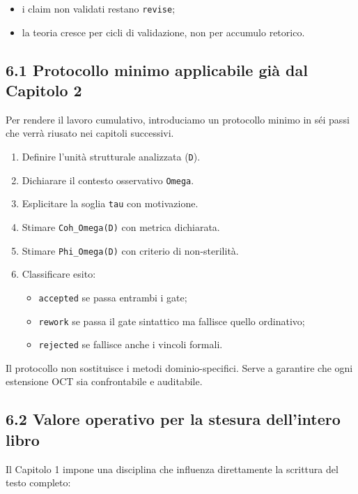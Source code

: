 \begin{enumerate}
  \begin{itemize}
  \tightlist
  \item
    i claim non validati restano \texttt{revise};
  \item
    la teoria cresce per cicli di validazione, non per accumulo retorico.
  \end{itemize}
\end{enumerate}

\subsection{6.1 Protocollo minimo applicabile già dal Capitolo 2}

Per rendere il lavoro cumulativo, introduciamo un protocollo minimo in séi passi che verrà riusato nei capitoli successivi.

\begin{enumerate}
\def\labelenumi{\arabic{enumi}.}
\tightlist
\item
  Definire l'unità strutturale analizzata (\texttt{D}).
\item
  Dichiarare il contesto osservativo \texttt{Omega}.
\item
  Esplicitare la soglia \texttt{tau} con motivazione.
\item
  Stimare \texttt{Coh\_Omega(D)} con metrica dichiarata.
\item
  Stimare \texttt{Phi\_Omega(D)} con criterio di non-sterilità.
\item
  Classificare esito:

  \begin{itemize}
  \tightlist
  \item
    \texttt{accepted} se passa entrambi i gate;
  \item
    \texttt{rework} se passa il gate sintattico ma fallisce quello ordinativo;
  \item
    \texttt{rejected} se fallisce anche i vincoli formali.
  \end{itemize}
\end{enumerate}

Il protocollo non sostituisce i metodi dominio-specifici. Serve a garantire che ogni estensione OCT sia confrontabile e auditabile.

\subsection{6.2 Valore operativo per la stesura dell'intero libro}

Il Capitolo 1 impone una disciplina che influenza direttamente la scrittura del testo completo:

